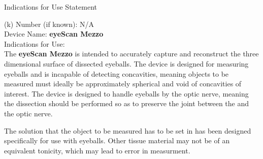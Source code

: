 \newpage
{}

\begin{center}
  \Large{Indications for Use Statement}\\[.5in]
\end{center}


\onehalfspacing

(k) Number (if known): N/A \\
Device Name: \textbf{eyeScan Mezzo} \\
Indications for Use: \\

The \textbf{eyeScan Mezzo} is intended to accurately capture and
reconstruct the three dimensional surface of dissected eyeballs. The
device is designed for measuring eyeballs and is incapable of
detecting concavities, meaning objects to be measured must ideally be
approximately spherical and void of concavities of interest. The
device is designed to handle eyeballs by the optic nerve, meaning the
dissection should be performed so as to preserve the joint between the
and the optic nerve.

The solution that the object to be measured has to be set in has been
designed specifically for use with eyeballs. Other tissue material may
not be of an equivalent tonicity, which may lead to error in
measurment.

